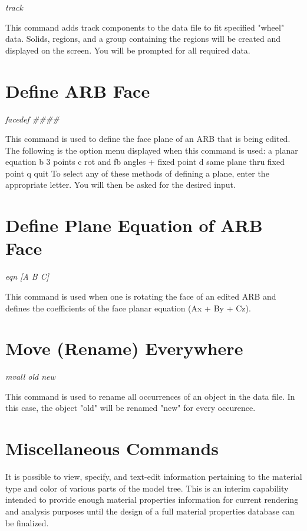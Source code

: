 {\em \center
track
}

This command adds track components to the data file to fit specified
"wheel" data.
Solids, regions, and a group containing the regions will be created and
displayed on the screen.
You will be prompted for all required data.

\section{Define ARB Face}

{\em \center
facedef \#\#\#\#
}

This command is used to define the face plane of an ARB that is being edited.
The following is the option menu displayed when this command is used:
        a     planar equation
        b     3 points
        c     rot and fb angles + fixed point
        d     same plane thru fixed point
        q     quit
To select any of these methods of defining a plane, enter the appropriate
letter.  You will then be asked for the desired input.

\section{Define Plane Equation of ARB Face}

{\em \center
eqn [A B C]
}

This command is used when one is rotating the face of an edited ARB and defines
the coefficients of the face planar equation (Ax + By + Cz).

\section{Move (Rename) Everywhere}

{\em \center
mvall old new
}

This command is used to rename all occurrences of an object in the data file.  In this
case, the object "old" will be renamed "new" for every occurence.

\section{Miscellaneous Commands}

It is possible to view, specify, and text-edit
information pertaining to the material type and color of various
parts of the model tree.  This is an interim capability
intended to provide enough material properties information for
current rendering and analysis purposes until the design of a
full material properties database can be finalized.

